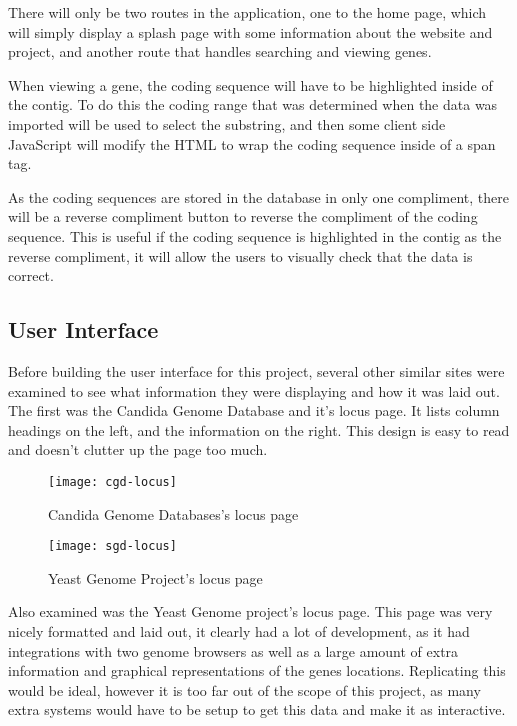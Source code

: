 There will only be two routes in the application, one to the home page, which will simply display a splash page with some information about the website and project, and another route that handles searching and viewing genes.

When viewing a gene, the coding sequence will have to be highlighted inside of the contig. To do this the coding range that was determined when the data was imported will be used to select the substring, and then some client side JavaScript will modify the HTML to wrap the coding sequence inside of a span tag. 

As the coding sequences are stored in the database in only one compliment, there will be a reverse compliment button to reverse the compliment of the coding sequence. This is useful if the coding sequence is highlighted in the contig as the reverse compliment, it will allow the users to visually check that the data is correct. 

\subsection{User Interface}
Before building the user interface for this project, several other similar sites were examined to see what information they were displaying and how it was laid out. The first was the Candida Genome Database\cite{cgd} and it's locus page. It lists column headings on the left, and the information on the right. This design is easy to read and doesn't clutter up the page too much.

\begin{figure}[H]
\begin{center}
\texttt{[image: cgd-locus]}
\caption{Candida Genome Databases's locus page}
\end{center}
\end{figure}


\begin{figure}[H]
\begin{center}
\texttt{[image: sgd-locus]}
\caption{Yeast Genome Project's locus page}
\end{center}
\end{figure}

Also examined was the Yeast Genome\cite{sgd} project's locus page. This page was very nicely formatted and laid out, it clearly had a lot of development, as it had integrations with two genome browsers as well as a large amount of extra information and graphical representations of the genes locations. Replicating this would be ideal, however it is too far out of the scope of this project, as many extra systems would have to be setup to get this data and make it as interactive.

